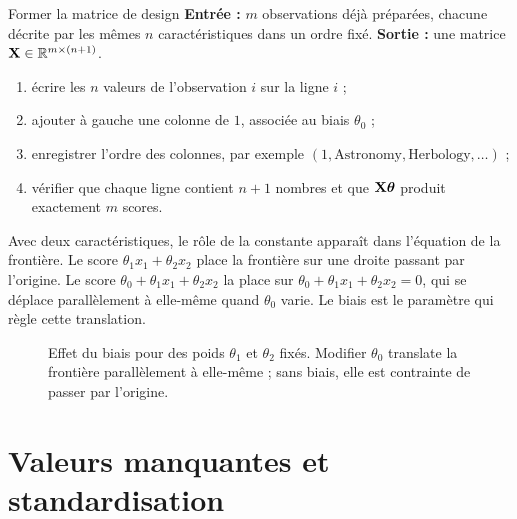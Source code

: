 \begin{procedure}{Former la matrice de design}
\textbf{Entrée :} $m$ observations déjà préparées, chacune décrite par les mêmes
$n$ caractéristiques dans un ordre fixé. \textbf{Sortie :} une matrice
$\mathbf{X}\in\mathbb{R}^{m\times(n+1)}$.
\begin{enumerate}
  \item écrire les $n$ valeurs de l'observation $i$ sur la ligne $i$ ;
  \item ajouter à gauche une colonne de $1$, associée au biais $\theta_0$ ;
  \item enregistrer l'ordre des colonnes, par exemple
        $(1,\text{Astronomy},\text{Herbology},\ldots)$ ;
  \item vérifier que chaque ligne contient $n+1$ nombres et que $\mathbf{X}\boldsymbol{\theta}$ produit
        exactement $m$ scores.
\end{enumerate}
\end{procedure}

Avec deux caractéristiques, le rôle de la constante apparaît dans l'équation de
la frontière. Le score $\theta_1x_1+\theta_2x_2$ place la frontière sur une
droite passant par l'origine. Le score $\theta_0+\theta_1x_1+\theta_2x_2$ la
place sur $\theta_0+\theta_1x_1+\theta_2x_2=0$, qui se déplace parallèlement à
elle-même quand $\theta_0$ varie. Le biais est le paramètre qui règle cette
translation.

\begin{figure}[htbp]
\centering
{}
\caption{Effet du biais pour des poids $\theta_1$ et $\theta_2$ fixés. Modifier
$\theta_0$ translate la frontière parallèlement à elle-même ; sans biais, elle
est contrainte de passer par l'origine.}
\label{fig:bias-geometry}
\end{figure}

\section{Valeurs manquantes et standardisation}

